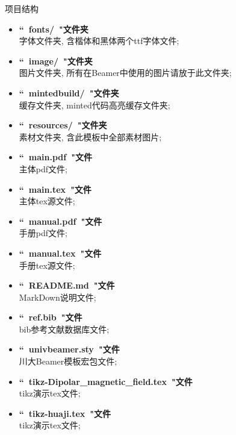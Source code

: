 \documentclass[hyperref, UTF8, CJK, aspectratio=169]{beamer}
\begin{document}
\begin{frame}{项目结构}
	\scriptsize
	\begin{multicols}{2}
	\begin{itemize}
		\item \textbf{``~fonts/~"\hfill 文件夹}\\字体文件夹, 含楷体和黑体两个ttf字体文件;
		\item \textbf{``~image/~"\hfill 文件夹}\\图片文件夹, 所有在Beamer中使用的图片请放于此文件夹;
		\item \textbf{``~mintedbuild/~"\hfill 文件夹}\\缓存文件夹, minted代码高亮缓存文件夹;
		\item \textbf{``~resources/~"\hfill 文件夹}\\素材文件夹, 含此模板中全部素材图片;
		\item \textbf{``~main.pdf~"\hfill 文件}\\主体pdf文件;
		\item \textbf{``~main.tex~"\hfill 文件}\\主体tex源文件;
		\item \textbf{``~manual.pdf~"\hfill 文件}\\手册pdf文件;
		\item \textbf{``~manual.tex~"\hfill 文件}\\手册tex源文件;
		\item \textbf{``~README.md~"\hfill 文件}\\MarkDown说明文件;
		\item \textbf{``~ref.bib~"\hfill 文件}\\bib参考文献数据库文件;
		\item \textbf{``~univbeamer.sty~"\hfill 文件}\\川大Beamer模板宏包文件;
		\item \textbf{``~tikz-Dipolar\_magnetic\_field.tex~"\hfill 文件}\\tikz演示tex文件;
		\item \textbf{``~tikz-huaji.tex~"\hfill 文件}\\tikz演示tex文件;
	\end{itemize}
	\end{multicols}
\end{frame}
\end{document}
